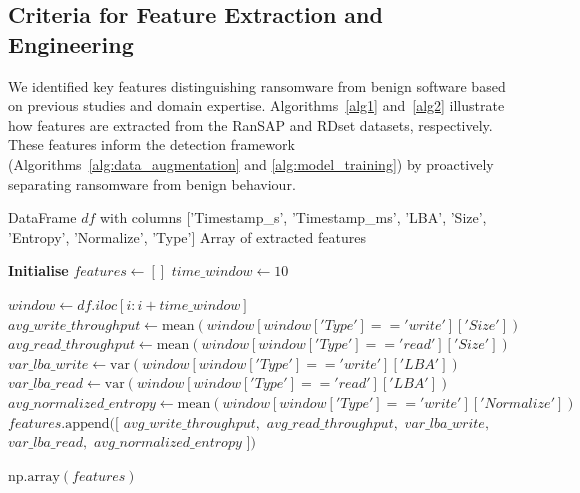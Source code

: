 \subsection{Criteria for Feature Extraction and Engineering}
 We identified key features distinguishing ransomware from benign software based on previous studies and domain expertise. Algorithms~\ref{alg1} and~\ref{alg2} illustrate how features are extracted from the RanSAP and RDset datasets, respectively.  These features inform the detection framework (Algorithms~\ref{alg:data_augmentation} and \ref{alg:model_training}) by proactively separating ransomware from benign behaviour.

 \begin{algorithm}
\caption{RanSAP Feature Extraction}\label{alg1}
\begin{algorithmic} 
\Require DataFrame $df$ with columns ['Timestamp\_s', 'Timestamp\_ms', 'LBA', 'Size', 'Entropy', 'Normalize', 'Type']
\Ensure Array of extracted features

\State \textbf{Initialise} $features \gets []$
\State $time\_window \gets 10$ 

    \State $window \gets df.iloc[i:i + time\_window]$
    \State $avg\_write\_throughput \gets \text{mean}(window[window['Type'] == 'write']['Size'])$
    \State $avg\_read\_throughput \gets \text{mean}(window[window['Type'] == 'read']['Size'])$
    \State $var\_lba\_write \gets \text{var}(window[window['Type'] == 'write']['LBA'])$
    \State $var\_lba\_read \gets \text{var}(window[window['Type'] == 'read']['LBA'])$
    \State $avg\_normalized\_entropy \gets \text{mean}(window[window['Type'] == 'write']['Normalize'])$
    \State $features.\text{append}([$ 
    \State \hspace{2em} $avg\_write\_throughput,$ 
    \State \hspace{2em} $avg\_read\_throughput,$ 
    \State \hspace{2em} $var\_lba\_write,$ 
    \State \hspace{2em} $var\_lba\_read,$ 
    \State \hspace{2em} $avg\_normalized\_entropy$ $])$
    
\EndFor

\State \Return $\text{np.array}(features)$

\end{algorithmic}
\end{algorithm}


